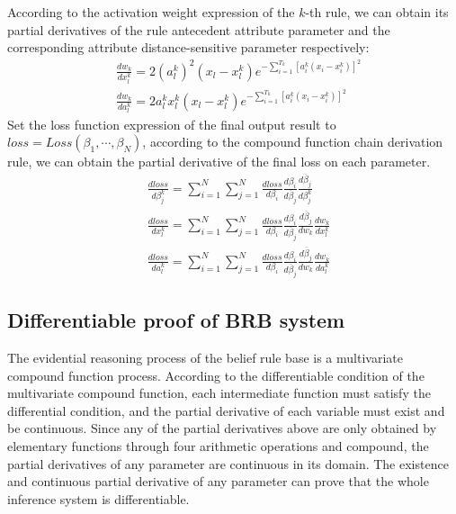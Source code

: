 \documentclass{ieeeaccess}
\begin{document}
According to the activation weight expression of the $k$-th rule, we can obtain its partial derivatives of the rule antecedent attribute parameter and the corresponding attribute distance-sensitive parameter respectively:
\begin{align}
     & \frac{dw_k}{dx_l^k}=2(a_l^k)^2(x_l-x_l^k)e^{-\sum_{i=1}^{T_k}[a_i^k(x_i-x_i^k)]^2}  \\
     & \frac{dw_k}{da_l^k}=2a_l^kx_l^k(x_l-x_l^k)e^{-\sum_{i=1}^{T_k}[a_i^k(x_i-x_i^k)]^2}
\end{align}
Set the loss function expression of the final output result to $loss=Loss(\beta_1,\cdots,\beta_N)$, according to the compound function chain derivation rule, we can obtain the partial derivative of the final loss on each parameter.
\begin{align}
     & \frac{dloss}{d\beta_j^k}=\sum_{i=1}^N\sum_{j=1}^N\frac{dloss}{d\beta_i}\frac{d\beta_i}{d\overline{\beta}_j}\frac{d\overline{\beta}_j}{d\beta_j^k}          \\
     & \frac{dloss}{dx_l^k}=\sum_{i=1}^N\sum_{j=1}^N\frac{dloss}{d\beta_i}\frac{d\beta_i}{d\overline{\beta}_j}\frac{d\overline{\beta}_j}{dw_k}\frac{dw_k}{dx_l^k} \\
     & \frac{dloss}{da_l^k}=\sum_{i=1}^N\sum_{j=1}^N\frac{dloss}{d\beta_i}\frac{d\beta_i}{d\overline{\beta}_j}\frac{d\overline{\beta}_j}{dw_k}\frac{dw_k}{da_l^k}
\end{align}

\subsection{Differentiable proof of BRB system}
The evidential reasoning process of the belief rule base is a multivariate compound function process. According to the differentiable condition of the multivariate compound function, each intermediate function must satisfy the differential condition,
and the partial derivative of each variable must exist and be continuous.
Since any of the partial derivatives above are only obtained by elementary functions through four arithmetic operations and compound,
the partial derivatives of any parameter are continuous in its domain.
The existence and continuous partial derivative of any parameter can prove that the whole inference system is differentiable.
\end{document}
